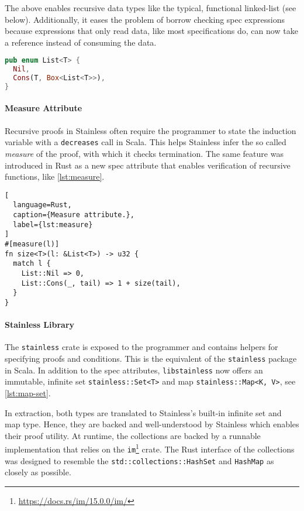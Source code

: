 The above enables recursive data types like the typical, functional linked-list
(see below). Additionally, it eases the problem of borrow checking spec
expressions because expressions that only read data, like most specifications
do, can now take a reference instead of consuming the data.

\begin{lstlisting}[language=Rust, style=short]
pub enum List<T> {
  Nil,
  Cons(T, Box<List<T>>),
}
\end{lstlisting}

\paragraph{Measure Attribute}

Recursive proofs in Stainless often require the programmer to state the
induction variable with a \lstinline!decreases! call in Scala. This helps
Stainless infer the so called \emph{measure} of the proof, with which it checks
termination. The same feature was introduced in Rust as a new spec attribute
that enables verification of recursive functions, like \autoref{lst:measure}.

\begin{lstlisting}[
  language=Rust,
  caption={Measure attribute.},
  label={lst:measure}
]
#[measure(l)]
fn size<T>(l: &List<T>) -> u32 {
  match l {
    List::Nil => 0,
    List::Cons(_, tail) => 1 + size(tail),
  }
}
\end{lstlisting}

\paragraph{Stainless Library}

The \lstinline!stainless! crate is exposed to the programmer and contains
helpers for specifying proofs and conditions. This is the equivalent of the
\lstinline!stainless! package in Scala. In addition to the spec attributes,
\lstinline!libstainless! now offers an immutable, infinite set
\passthrough{\lstinline!stainless::Set<T>!} and map
\passthrough{\lstinline!stainless::Map<K, V>!}, see \autoref{lst:map-set}.

In extraction, both types are translated to Stainless's built-in infinite set
and map type. Hence, they are backed and well-understood by Stainless which
enables their proof utility. At runtime, the collections are backed by a
runnable implementation that relies on the
\lstinline!im!\footnote{\url{https://docs.rs/im/15.0.0/im/}} crate. The Rust
interface of the collections was designed to resemble the
\lstinline!std::collections::HashSet! and \lstinline!HashMap! as closely as
possible.


